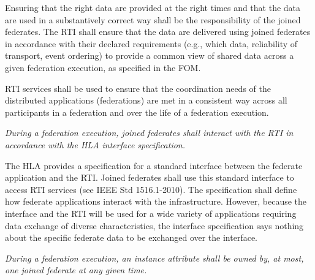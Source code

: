 Ensuring that the right data are provided at the right times and that the data are used in a substantively\linebreak
correct way shall be the responsibility of the joined federates. The RTI shall ensure that the data are\linebreak
delivered using joined federates in accordance with their declared requirements (e.g., which data, reliability\linebreak
of transport, event ordering) to provide a common view of shared data across a given federation execution,\linebreak
as specified in the FOM.
\vspace{6pt}

RTI services shall be used to ensure that the coordination needs of the distributed applications (federations)\linebreak
are met in a consistent way across all participants in a federation and over the life of a federation execution.


\textit{During a federation execution, joined federates shall interact with the RTI in accordance with the HLA\linebreak
interface specification.}
\vspace{6pt}

The HLA provides a specification for a standard interface between the federate application and the RTI.\linebreak
Joined federates shall use this standard interface to access RTI services (see IEEE Std 1516.1-2010). The\linebreak
specification shall define how federate applications interact with the infrastructure. However, because the\linebreak
interface and the RTI will be used for a wide variety of applications requiring data exchange of diverse\linebreak
characteristics, the interface specification says nothing about the specific federate data to be exchanged over\linebreak
the interface.


\textit{During a federation execution, an instance attribute shall be owned by, at most, one joined federate at any\linebreak
given time.}
\vspace{6pt}

